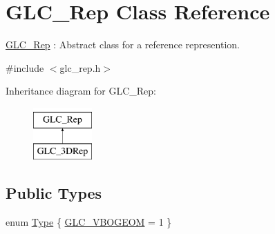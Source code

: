 \hypertarget{class_g_l_c___rep}{\section{G\-L\-C\-\_\-\-Rep Class Reference}
\label{class_g_l_c___rep}
}


\hyperlink{class_g_l_c___rep}{G\-L\-C\-\_\-\-Rep} \-: Abstract class for a reference represention.  




{\ttfamily \#include $<$glc\-\_\-rep.\-h$>$}

Inheritance diagram for G\-L\-C\-\_\-\-Rep\-:\begin{figure}[H]
\begin{center}
\leavevmode
\includegraphics[height=2.000000cm]{class_g_l_c___rep}
\end{center}
\end{figure}
\subsection*{Public Types}
\begin{DoxyCompactItemize}
\item 
enum \hyperlink{class_g_l_c___rep_a7e8109c48d066fc7d4a01404a795f9ce}{Type} \{ \hyperlink{class_g_l_c___rep_a7e8109c48d066fc7d4a01404a795f9cea0abba853dee803f32d1fc942d49e79dc}{G\-L\-C\-\_\-\-V\-B\-O\-G\-E\-O\-M} = 1
 \}
\end{DoxyCompactItemize}
